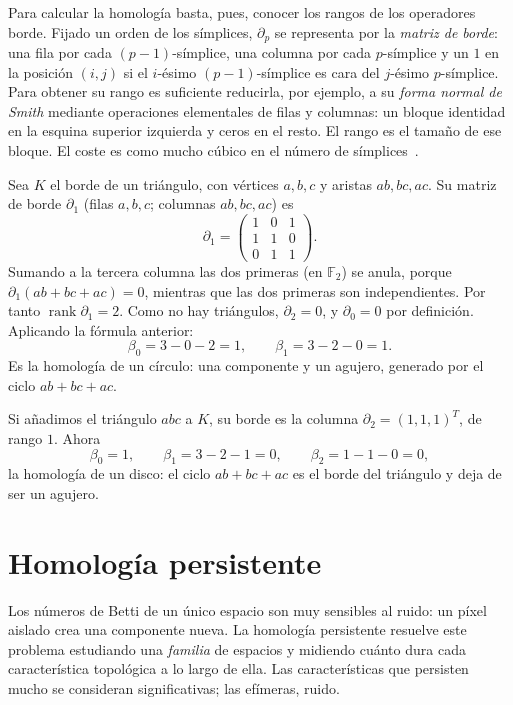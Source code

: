 Para calcular la homología basta, pues, conocer los rangos de los
operadores borde. Fijado un orden de los símplices, $\partial_p$ se
representa por la \emph{matriz de borde}: una fila por cada
$(p-1)$-símplice, una columna por cada $p$-símplice y un $1$ en la
posición $(i,j)$ si el $i$-ésimo $(p-1)$-símplice es cara del $j$-ésimo
$p$-símplice. Para obtener su rango es suficiente reducirla, por ejemplo,
a su \emph{forma normal de Smith} mediante operaciones elementales de
filas y columnas: un bloque identidad en la esquina superior izquierda y
ceros en el resto. El rango es el tamaño de ese bloque. El coste es como
mucho cúbico en el número de símplices~\cite[§IV.2]{edelsbrunner2010}.

\begin{ejemplo}
Sea $K$ el borde de un triángulo, con vértices $a,b,c$ y aristas
$ab,bc,ac$. Su matriz de borde $\partial_1$ (filas $a,b,c$; columnas
$ab,bc,ac$) es
\[
  \partial_1=\begin{pmatrix}1&0&1\\1&1&0\\0&1&1\end{pmatrix}.
\]
Sumando a la tercera columna las dos primeras (en $\mathbb{F}_2$) se
anula, porque $\partial_1(ab+bc+ac)=0$, mientras que las dos primeras son
independientes. Por tanto $\operatorname{rank}\partial_1=2$. Como no hay
triángulos, $\partial_2=0$, y $\partial_0=0$ por definición. Aplicando la
fórmula anterior:
\[
  \beta_0=3-0-2=1,\qquad \beta_1=3-2-0=1.
\]
Es la homología de un círculo: una componente y un agujero, generado por
el ciclo $ab+bc+ac$.

Si añadimos el triángulo $abc$ a $K$, su borde es la columna
$\partial_2=(1,1,1)^{T}$, de rango $1$. Ahora
\[
  \beta_0=1,\qquad \beta_1=3-2-1=0,\qquad \beta_2=1-1-0=0,
\]
la homología de un disco: el ciclo $ab+bc+ac$ es el borde del triángulo y
deja de ser un agujero.
\end{ejemplo}

\section{Homología persistente}
\label{sec:persistencia}

Los números de Betti de un único espacio son muy sensibles al ruido: un
píxel aislado crea una componente nueva. La homología persistente resuelve
este problema estudiando una \emph{familia} de espacios y midiendo cuánto
dura cada característica topológica a lo largo de ella. Las características
que persisten mucho se consideran significativas; las efímeras, ruido.

